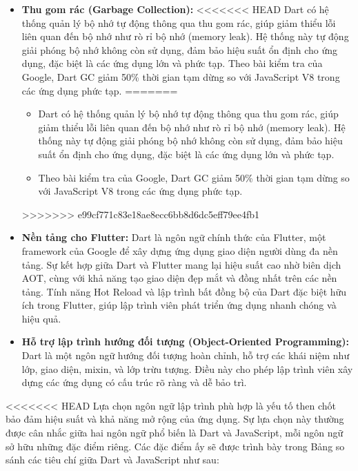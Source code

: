 \documentclass[../DoAn.tex]{subfiles}
\numberwithin{figure}{chapter}
\begin{document}
\begin{itemize}
\begin{itemize}
\begin{itemize}
    \item \textbf{Thu gom rác (Garbage Collection):} 
<<<<<<< HEAD
        Dart có hệ thống quản lý bộ nhớ tự động thông qua thu gom rác, giúp giảm thiểu lỗi liên quan đến bộ nhớ như rò rỉ bộ nhớ (memory leak). Hệ thống này tự động giải phóng bộ nhớ không còn sử dụng, đảm bảo hiệu suất ổn định cho ứng dụng, đặc biệt là các ứng dụng lớn và phức tạp.
        Theo bài kiểm tra của Google, Dart GC giảm 50\% thời gian tạm dừng so với JavaScript V8 trong các ứng dụng phức tạp.
=======
    \begin{itemize}
        \item Dart có hệ thống quản lý bộ nhớ tự động thông qua thu gom rác, giúp giảm thiểu lỗi liên quan đến bộ nhớ như rò rỉ bộ nhớ (memory leak). Hệ thống này tự động giải phóng bộ nhớ không còn sử dụng, đảm bảo hiệu suất ổn định cho ứng dụng, đặc biệt là các ứng dụng lớn và phức tạp.
        \item Theo bài kiểm tra của Google, Dart GC giảm 50\% thời gian tạm dừng so với JavaScript V8 trong các ứng dụng phức tạp.
    \end{itemize}
>>>>>>> e99cf771c83e18ae8ecc6bb8d6dc5eff79ee4fb1

    \item \textbf{Nền tảng cho Flutter:} 
    Dart là ngôn ngữ chính thức của Flutter, một framework của Google để xây dựng ứng dụng giao diện người dùng đa nền tảng. Sự kết hợp giữa Dart và Flutter mang lại hiệu suất cao nhờ biên dịch AOT, cùng với khả năng tạo giao diện đẹp mắt và đồng nhất trên các nền tảng. Tính năng Hot Reload và lập trình bất đồng bộ của Dart đặc biệt hữu ích trong Flutter, giúp lập trình viên phát triển ứng dụng nhanh chóng và hiệu quả.

    \item \textbf{Hỗ trợ lập trình hướng đối tượng (Object-Oriented Programming):} 
    Dart là một ngôn ngữ hướng đối tượng hoàn chỉnh, hỗ trợ các khái niệm như lớp, giao diện, mixin, và lớp trừu tượng. Điều này cho phép lập trình viên xây dựng các ứng dụng có cấu trúc rõ ràng và dễ bảo trì.
\end{itemize}
<<<<<<< HEAD
Lựa chọn ngôn ngữ lập trình phù hợp là yếu tố then chốt bảo đảm hiệu suất và khả năng mở rộng của ứng dụng. Sự lựa chọn này thường được cân nhắc giữa hai ngôn ngữ phổ biến là Dart và JavaScript, mỗi ngôn ngữ sở hữu những đặc điểm riêng. Các đặc điểm ấy sẽ được trình bày trong Bảng so sánh các tiêu chí giữa Dart và JavaScript như sau:

















\end{itemize}
\end{itemize}
\end{document}
